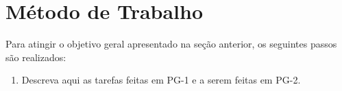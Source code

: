 
\section{Método de Trabalho}
\label{sec-metodo}

Para atingir o objetivo geral apresentado na seção anterior, os seguintes passos são realizados:

\begin{enumerate}
	
	\item Descreva aqui as tarefas feitas em PG-1 e a serem feitas em PG-2.
	
\end{enumerate}